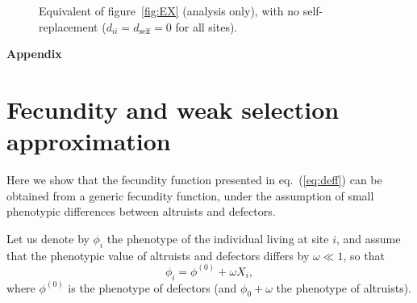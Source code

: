 \documentclass[11pt, letterpaper]{article}
\renewcommand{\eqref}[1]{\textup{{\normalfont eq.~(\ref{#1}}\normalfont)}}
\newcommand{\appname}[0]{Appendix}
\newcommand{\dself}{d_{\textrm{self}}}
\begin{document}
\begin{figure}
\begin{tabular}{ccc}
\end{tabular}
\caption{Equivalent of figure~\ref{fig:EX} (analysis only), with no self-replacement ($d_{ii} = \dself = 0$ for all sites). }
\label{fig:EXdself}
\end{figure}

\clearpage

\appendix
 
\renewcommand{\theequation}{\thesection.\arabic{equation}}
\setcounter{equation}{0}  %
 
\renewcommand{\thefigure}{S\arabic{figure}}
\setcounter{figure}{0}

\renewcommand{\thetable}{S\arabic{table}}
\setcounter{table}{0} 
\begin{center}
{\LARGE \bfseries\sffamily  \appname}
\end{center}

\section{Fecundity and weak selection approximation\label{sec:app:F}}

Here we show that the fecundity function presented in \eqref{eq:deff} can be obtained from a generic fecundity function, under the assumption of small phenotypic differences between altruists and defectors. 

Let us denote by $\phi_i$ the phenotype of the individual living at site $i$, and assume that the phenotypic value of altruists and defectors differs by $\omega\ll 1$, so that 
\begin{equation}\label{eq:app:phidef}
\phi_i = \phi^{(0)} + \omega X_i,
\end{equation}
where $\phi^{(0)}$ is the phenotype of defectors (and $\phi_0 + \omega$ the phenotype of altruists). 
\end{document}
